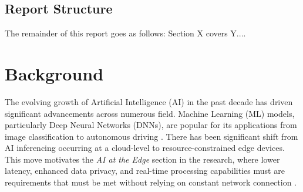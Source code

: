 \documentclass[12pt, a4paper, ukenglish]{article}
\begin{document}
    
    
    
    \subsection{Report Structure}
    The remainder of this report goes as follows: Section X covers Y....

\clearpage  
\newpage
\section{Background} \label{sec: background}
    The evolving growth of Artificial Intelligence (AI) in the past decade has driven significant advancements across numerous field. Machine Learning (ML) models, particularly Deep Neural Networks (DNNs), are popular for its applications from image classification to autonomous driving \cite{parashar_scnn_2017}. There has been significant shift from AI inferencing occurring at a cloud-level to resource-constrained edge devices. This move motivates the \textit{AI at the Edge} section in the research, where lower latency, enhanced data privacy, and real-time processing capabilities must are requirements that must be met without relying on constant network connection \cite{kim_energy-efficient_2020}.
\end{document}
